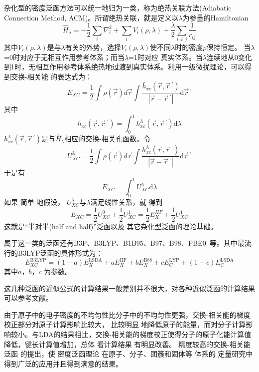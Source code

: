 杂化型的密度泛函方法可以统一地归为一类，称为绝热关联方法(Adiabatic Connection Method, ACM)。所谓绝热关联，就是定义以$\lambda$为参量的Hamiltonian
\begin{equation}
  \hat H_{\lambda}=-\dfrac12\sum_i\nabla_i^2+\sum_iV_i(\rho,\lambda)+\dfrac{\lambda}2\sum_{i\neq j}\dfrac1{r_{ij}}
  \label{eq:dft-27}
\end{equation}
其中$V_i(\rho,\lambda)$是与$\lambda$有关的外势，选择$V_i(\rho,\lambda)$使不同$\lambda$时的密度$\rho$保持恒定。%
当$\lambda$=0时对应于无相互作用参考体系；而当$\lambda$=1时对应%
真实体系。当$\lambda$连续地从0变化到1时，无相互作用参考体系绝热地过渡到真实体系。利用一级微扰理论\cite{JCP88-1053_1988}，可以得到交换-相关能%
{的}表达式为：
$$E_{XC}=\dfrac12\int\rho(\vec r)d\vec r\int\dfrac{\bar h_{xc}(\vec r,\vec r\,^{\prime})}{|\vec r-\vec r\,^{\prime}|}\textrm{d}\vec r\,^{\prime}$$
其中$$\bar h_{xc}(\vec r,\vec r\,^{\prime})=\int_0^1h_{xc}^{\lambda}(\vec r,\vec r\,^{\prime})\textrm{d}\lambda$$
$h_{xc}^{\lambda}(\vec r,\vec r\,^{\prime})$是与$\hat H_{\lambda}$相应的交换-相关孔函数。令
$$U_{XC}^{\lambda}=\dfrac12\int\rho(\vec r)d\vec r\int\dfrac{h_{xc}^{\lambda}(\vec r,\vec r\,^{\prime})}{|\vec r-\vec r\,^{\prime}|}\textrm{d}\vec r\,^{\prime}$$
于是有$$E_{XC}=\int_0^1U_{XC}^{\lambda}\textrm{d}\lambda$$
如果%
简单%
{地}假设，%
$U_{XC}^{\lambda}$与$\lambda$满足线性关系，就%
得到
$$E_{XC}=\dfrac12U_{XC}^0+\dfrac12U_{XC}^1=\dfrac12E_X^{HF}+\dfrac12U_{XC}^1$$
这就是“半对半(half and half)”泛函以及%
{其它}杂化型泛函的理论基础。

属于这一类的泛函还有B3P\cite{JCP98-5648_1993}、B3LYP\cite{JPC98-11623_1994}、B1B95\cite{JCP104-1040_1995}、B97\cite{JCP107-8554_1997}、B98\cite{JCP109-2092_1998}、PBE0\cite{JCP110-6158_1999}~等。其中最流行的B3LYP泛函的具体形式为：
$$E_{XC}^{\mathrm{B3LYP}}=(1-a)E_X^{\mathrm{LSDA}}+aE_X^{\mathrm{HF}}+bE_X^{\mathrm{B88}}+cE_C^{\mathrm{LYP}}+(1-c)E_C^{\mathrm{LSDA}}$$
其中$a$，$b$，$c$%
为参数。

这几种泛函的近似公式的计算结果{一般}差别并不很大，对各种近似泛函的计算结果可以参考文献。

由于原子中的电子密度的不均匀性比分子中的不均匀性更强，交换-相关能的梯度校正部分对原子{计算}影响比较大，%
比较明显%
{地}降低原子的能量，而对分子{计算}影响较小{。}与LDA的结果相比，交换-相关能的梯度校正使得分子的原子化能{计算值}降低，键长{计算值}增加，总体%
{看计算}结果%
有明显改善。%
精度较高的交换-相关能泛函%
的提出，使%
密度泛函理论%
{在}原子、分子、团簇和固体等%
体系的%
{定量研究中得到广泛的应用并且得到满意的结果。}

